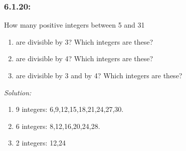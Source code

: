 \documentclass[a4paper]{article}
\begin{document}
	\subsubsection*{6.1.20:}How many positive integers between 5 and 31
	\begin{enumerate}[label = \textbf{\alph*)}]
	    \item are divisible by 3? Which integers are these?
	    \item are divisible by 4? Which integers are these?
        \item are divisible by 3 and by 4? Which integers are these?
	\end{enumerate}
	\textit{Solution:} \\ 
	\begin{enumerate}[label = \textbf{\alph*)}]
	    \item 9 integers: 6,9,12,15,18,21,24,27,30.
	    \item 6 integers: 8,12,16,20,24,28.
        \item 2 integers: 12,24
	\end{enumerate}
\end{document}
